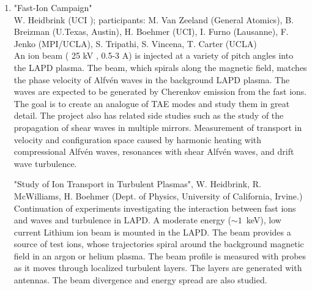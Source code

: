 \documentclass[11pt]{article}
\begin{document}
\begin{enumerate}

\item "Fast-Ion Campaign"\\ W. Heidbrink (UCI ); participants: M. Van
  Zeeland (General Atomics), B. Breizman (U.Texas, Austin), H. Boehmer
  (UCI), I. Furno (Lausanne), F. Jenko (MPI/UCLA), S. Tripathi,
  S. Vincena, T. Carter (UCLA) \\ An ion beam ( 25 kV , 0.5-3 A) is
   injected at a variety of pitch angles into the LAPD plasma. The
  beam, which spirals along the magnetic field, matches the phase
  velocity of Alfv\'{e}n waves in the background LAPD plasma. The
  waves are expected to be generated by Cherenkov emission from the
  fast ions. The goal is to create an analogue of TAE modes and study
  them in great detail. The project also has related side studies such
  as the study of the propagation of shear waves in multiple
  mirrors. Measurement of transport in velocity and configuration
  space caused by harmonic heating with compressional Alfv\'{e}n
  waves, resonances with shear Alfv\'{e}n waves, and drift wave
  turbulence.

  "Study of Ion Transport in Turbulent Plasmas", W. Heidbrink,
  R. McWilliams, H. Boehmer (Dept. of Physics, University of
  California, Irvine.)\\ Continuation of experiments investigating the
  interaction between fast ions and waves and turbulence in LAPD.  A
  moderate energy ($\sim 1$~keV), low current Lithium ion beam is
  mounted in the LAPD. The beam provides a source of test ions, whose
  trajectories spiral around the background
  magnetic field in an argon or helium plasma. The beam profile is
   measured with probes as it moves through localized turbulent
  layers. The layers are generated with antennas. The beam divergence
  and energy spread are also studied.



\end{enumerate}
\end{document}

